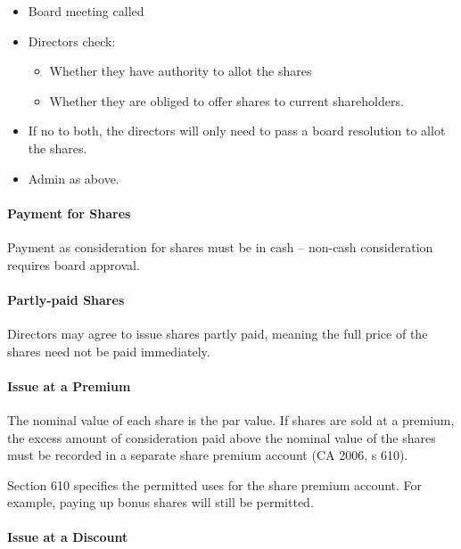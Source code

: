 \documentclass[
]{article}
\providecommand{\tightlist}{%
  \setlength{\itemsep}{0pt}\setlength{\parskip}{0pt}}
\begin{document}
\begin{itemize}
\tightlist
\item
  Board meeting called
\item
  Directors check:

  \begin{itemize}
  \tightlist
  \item
    Whether they have authority to allot the shares
  \item
    Whether they are obliged to offer shares to current shareholders.
  \end{itemize}
\item
  If no to both, the directors will only need to pass a board resolution
  to allot the shares.
\item
  Admin as above.
\end{itemize}

\hypertarget{payment-for-shares}{%
\paragraph{Payment for Shares}\label{payment-for-shares}}

Payment as consideration for shares must be in cash -- non-cash
consideration requires board approval.

\hypertarget{partly-paid-shares}{%
\paragraph{Partly-paid Shares}\label{partly-paid-shares}}

Directors may agree to issue shares partly paid, meaning the full price
of the shares need not be paid immediately.

\hypertarget{issue-at-a-premium}{%
\paragraph{Issue at a Premium}\label{issue-at-a-premium}}

The nominal value of each share is the par value. If shares are sold at
a premium, the excess amount of consideration paid above the nominal
value of the shares must be recorded in a separate share premium account
(CA 2006, s 610).

Section 610 specifies the permitted uses for the share premium account.
For example, paying up bonus shares will still be permitted.

\hypertarget{issue-at-a-discount}{%
\paragraph{Issue at a Discount}\label{issue-at-a-discount}}
\end{document}
